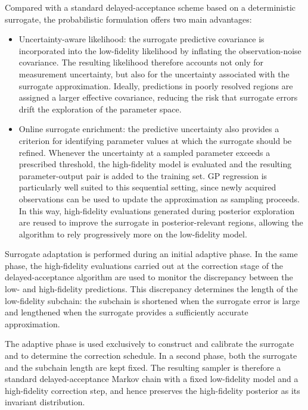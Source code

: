 \documentclass{elsarticle}
\begin{document}
Compared with a standard delayed-acceptance scheme based on a deterministic
surrogate, the probabilistic formulation offers two main advantages:
\begin{itemize}
\item Uncertainty-aware likelihood:
the surrogate predictive covariance is incorporated into the
low-fidelity likelihood by inflating the observation-noise covariance.
The resulting likelihood therefore accounts not only for measurement
uncertainty, but also for the uncertainty associated with the surrogate
approximation. Ideally, predictions in poorly resolved regions are
assigned a larger effective covariance, reducing the risk that surrogate
errors drift the exploration of the parameter space.

\item Online surrogate enrichment:
the predictive uncertainty also provides a criterion for identifying
parameter values at which the surrogate should be refined. Whenever the
uncertainty at a sampled parameter exceeds a prescribed threshold, the
high-fidelity model is evaluated and the resulting parameter-output pair
is added to the training set. GP regression is particularly well suited to
this sequential setting, since newly acquired observations can be used to
update the approximation as sampling proceeds. In this way,
high-fidelity evaluations generated during posterior exploration are
reused to improve the surrogate in posterior-relevant regions, allowing
the algorithm to rely progressively more on the low-fidelity model.

\end{itemize}

Surrogate adaptation is performed during an initial adaptive phase. In the
same phase, the high-fidelity evaluations carried out at the correction stage
of the delayed-acceptance algorithm are used to monitor the discrepancy
between the low- and high-fidelity predictions. This discrepancy determines
the length of the low-fidelity subchain: the subchain is shortened when the
surrogate error is large and lengthened when the surrogate provides a
sufficiently accurate approximation.

The adaptive phase is used exclusively to construct and calibrate the
surrogate and to determine the correction schedule. In a second phase,
both the surrogate and the subchain length are kept fixed.
The resulting sampler is therefore a standard delayed-acceptance Markov chain
with a fixed low-fidelity model and a high-fidelity correction step, and hence
preserves the high-fidelity posterior as its invariant distribution.
\end{document}
